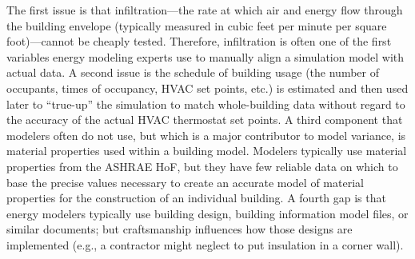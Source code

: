 \documentclass[preprint, review, 12pt]{elsarticle}
\begin{document}
The first issue is that infiltration---the rate at which air and energy flow through the building envelope (typically measured in cubic feet per minute per square foot)---cannot be cheaply tested. %
Therefore, infiltration is often one of the first variables energy modeling experts use to manually align a simulation model with actual data.
A second issue is the schedule of building usage (the number of occupants, times of occupancy, HVAC set points, etc.) %
is estimated and then used later to ``true-up'' the simulation to match whole-building data without regard to the accuracy of the actual HVAC thermostat set points.
A third component that modelers often do not use, but which is a major contributor to model variance, is material properties used within a building model. Modelers typically use material properties from the ASHRAE HoF, %
but they
have few reliable data on which to base the precise values necessary to create an accurate model of material properties for the construction of an individual building.
A fourth gap is that energy modelers typically use building design, building information model files, or similar documents; but craftsmanship influences how those designs are implemented (e.g., a contractor might neglect to put insulation in a corner wall). %
\end{document}
